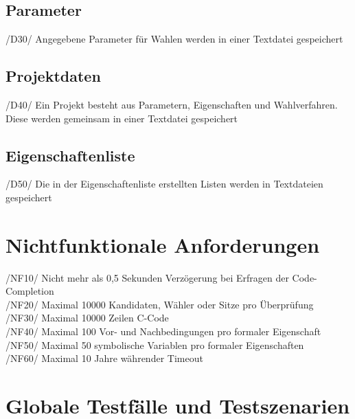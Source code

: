 \documentclass[a4paper]{scrreprt}
\begin{document}
\section{Parameter}
/D30/ Angegebene Parameter für Wahlen werden in einer Textdatei gespeichert \\


\section{Projektdaten}
/D40/ Ein Projekt besteht aus Parametern, Eigenschaften und Wahlverfahren. Diese werden gemeinsam in einer Textdatei gespeichert \\

\section{Eigenschaftenliste}
/D50/ Die in der Eigenschaftenliste erstellten Listen werden in Textdateien gespeichert \\

\chapter{Nichtfunktionale Anforderungen}
/NF10/ Nicht mehr als 0,5 Sekunden Verzögerung bei Erfragen der Code-Completion \\
/NF20/ Maximal 10000 Kandidaten, Wähler oder Sitze pro Überprüfung \\
/NF30/ Maximal 10000 Zeilen C-Code \\
/NF40/ Maximal 100 Vor- und Nachbedingungen pro formaler Eigenschaft \\
/NF50/ Maximal 50 symbolische Variablen pro formaler Eigenschaften \\
/NF60/ Maximal 10 Jahre währender Timeout \\


\chapter{Globale Testfälle und Testszenarien}
\end{document}
